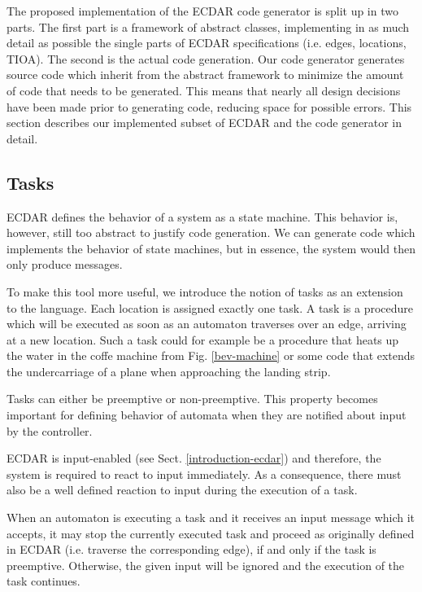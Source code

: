 The proposed implementation of the ECDAR code generator is split up
in two parts. The first part is a framework of abstract classes, implementing
in as much detail as possible the single parts of ECDAR specifications
(i.e. edges, locations, TIOA). The second is the actual code generation.
Our code generator generates source code which inherit from the abstract
framework to minimize the amount of code that needs to be
generated. This means that nearly all design decisions have been made
prior to generating code, reducing space for possible errors. This
section describes our implemented subset of ECDAR and the code generator
in detail.

\subsection{Tasks}
\label{subsec:tasks}

ECDAR defines the behavior of a system as a state machine. This behavior
is, however, still too abstract to justify code generation. We can
generate code which implements the behavior of state machines, but
in essence, the system would then only produce messages.

To make this tool more useful, we introduce the notion of tasks as an extension
to the language. Each location is assigned exactly one task. A task is a
procedure which will be executed as soon as an automaton traverses over an edge,
arriving at a new location. Such a task could for example be a procedure that
heats up the water in the coffe machine from Fig. \ref{bev-machine} or some code
that extends the undercarriage of a plane when approaching the landing strip.

Tasks can either be preemptive or non-preemptive. This property becomes
important for defining behavior of automata when they are notified
about input by the controller.

ECDAR is input-enabled (see Sect. \ref{introduction-ecdar}) and therefore,
the system is required to react to input immediately. As a consequence,
there must also be a well defined reaction to input during the execution
of a task.

When an automaton is executing a task and it receives an input message
which it accepts, it may stop the currently executed task and proceed
as originally defined in ECDAR (i.e. traverse the corresponding edge),
if and only if the task is preemptive. Otherwise, the given input
will be ignored and the execution of the task continues.

